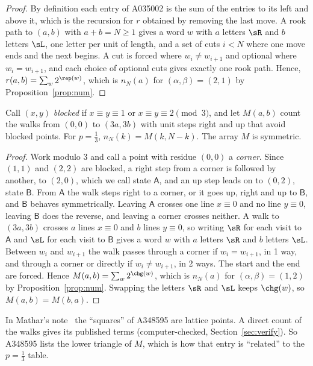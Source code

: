 \begin{proof}
By definition each entry of A035002 is the sum of the entries to its left and above it, which is the
recursion for $r$ obtained by removing the last move. A rook path to $(a,b)$ with $a+b=N\ge1$ gives
a word $w$ with $a$ letters $\sR$ and $b$ letters $\sL$, one letter per unit of length, and a set of
cuts $i<N$ where one move ends and the next begins. A cut is forced where $w_i\ne w_{i+1}$ and
optional where $w_i=w_{i+1}$, and each choice of optional cuts gives exactly one rook path. Hence,
$r(a,b)=\sum_w2^{\rep(w)}$, which is $n_N(a)$ for $(\alpha,\beta)=(2,1)$ by
Proposition~\ref{prop:num}.
\end{proof}

\begin{theorem}[$p=\tfrac13$ and Mathar's blocked walks]\label{thm:mathar}
Call $(x,y)$ \emph{blocked} if $x\equiv y\equiv1$ or $x\equiv y\equiv2\pmod 3$, and let $M(a,b)$
count the walks from $(0,0)$ to $(3a,3b)$ with unit steps right and up that avoid blocked points.
For $p=\tfrac13$, $n_N(k)=M(k,N-k)$. The array $M$ is symmetric.
\end{theorem}

\begin{proof}
Work modulo $3$ and call a point with residue $(0,0)$ a \emph{corner}. Since $(1,1)$ and $(2,2)$ are
blocked, a right step from a corner is followed by another, to $(2,0)$, which we call state
$\mathsf A$, and an up step leads on to $(0,2)$, state $\mathsf B$. From $\mathsf A$ the walk steps
right to a corner, or it goes up, right and up to $\mathsf B$, and $\mathsf B$ behaves symmetrically. Leaving
$\mathsf A$ crosses one line $x\equiv0$ and no line $y\equiv0$, leaving $\mathsf B$ does the
reverse, and leaving a corner crosses neither. A walk to $(3a,3b)$ crosses $a$ lines $x\equiv0$ and
$b$ lines $y\equiv0$, so writing $\sR$ for each visit to $\mathsf A$ and $\sL$ for each visit
to $\mathsf B$ gives a word $w$ with $a$ letters $\sR$ and $b$ letters $\sL$. Between $w_i$ and $w_{i+1}$
the walk passes through a corner if $w_i=w_{i+1}$, in 1 way, and through a corner or directly if
$w_i\ne w_{i+1}$, in 2 ways. The start and the end are forced. Hence $M(a,b)=\sum_w2^{\chg(w)}$,
which is $n_N(a)$ for $(\alpha,\beta)=(1,2)$ by Proposition~\ref{prop:num}. Swapping the letters
$\sR$ and $\sL$ keeps $\chg(w)$, so $M(a,b)=M(b,a)$.
\end{proof}

In Mathar's note~\cite{mathar2022} the ``squares'' of A348595 are lattice points. A direct count
of the walks gives its published terms (computer-checked, Section~\ref{sec:verify}). So A348595
lists the lower triangle of $M$, which is how that entry is ``related'' to the $p=\tfrac13$ table.
